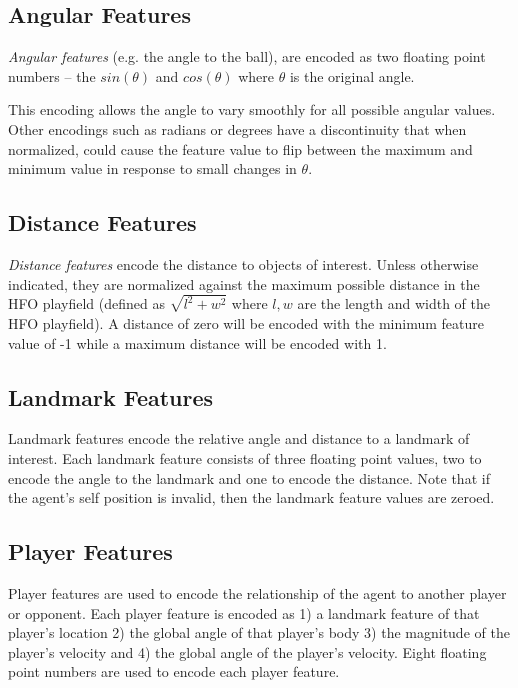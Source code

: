 \documentclass[12pt]{article}
\begin{document}
\subsection{Angular Features}

\textit{Angular features} (e.g. the angle to the ball), are encoded as two
floating point numbers -- the $sin(\theta)$ and $cos(\theta)$ where
$\theta$ is the original angle.

This encoding allows the angle to vary smoothly for all possible
angular values. Other encodings such as radians or degrees have a
discontinuity that when normalized, could cause the feature value to
flip between the maximum and minimum value in response to small
changes in $\theta$.

\subsection{Distance Features}

\textit{Distance features} encode the distance to objects of
interest. Unless otherwise indicated, they are normalized against the
maximum possible distance in the HFO playfield (defined as $\sqrt{l^2
  + w^2}$ where $l,w$ are the length and width of the HFO
playfield). A distance of zero will be encoded with the minimum
feature value of -1 while a maximum distance will be encoded with 1.

\subsection{Landmark Features}

Landmark features encode the relative angle and distance to a landmark
of interest. Each landmark feature consists of three floating point
values, two to encode the angle to the landmark and one to encode the
distance. Note that if the agent's self position is invalid, then the
landmark feature values are zeroed.

\subsection{Player Features}

Player features are used to encode the relationship of the agent to
another player or opponent. Each player feature is encoded as 1) a
landmark feature of that player's location 2) the global angle of that
player's body 3) the magnitude of the player's velocity and 4) the
global angle of the player's velocity. Eight floating point numbers
are used to encode each player feature.
\end{document}

